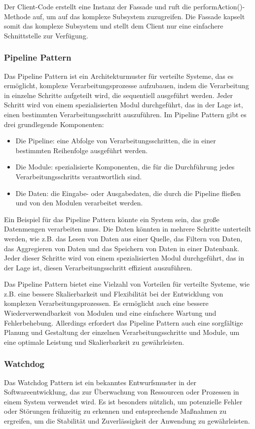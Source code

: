 \documentclass[../vs-script-first-v01.tex]{subfiles}
\begin{document}
Der Client-Code erstellt eine Instanz der Fassade und ruft die performAction()-Methode auf, um auf das komplexe Subsystem zuzugreifen. Die Fassade kapselt somit das komplexe Subsystem und stellt dem Client nur eine einfachere Schnittstelle zur Verfügung.




\subsubsection{Pipeline Pattern}
Das Pipeline Pattern ist ein Architekturmuster für verteilte Systeme, das es ermöglicht, komplexe Verarbeitungsprozesse aufzubauen, indem die Verarbeitung in einzelne Schritte aufgeteilt wird, die sequentiell ausgeführt werden. Jeder Schritt wird von einem spezialisierten Modul durchgeführt, das in der Lage ist, einen bestimmten Verarbeitungsschritt auszuführen. Im Pipeline Pattern gibt es drei grundlegende Komponenten:
\begin{itemize} 
\item Die Pipeline: eine Abfolge von Verarbeitungsschritten, die in einer bestimmten Reihenfolge ausgeführt werden.
\item Die Module: spezialisierte Komponenten, die für die Durchführung jedes Verarbeitungsschritts verantwortlich sind.
\item Die Daten: die Eingabe- oder Ausgabedaten, die durch die Pipeline fließen und von den Modulen verarbeitet werden.
\end{itemize} 
Ein Beispiel für das Pipeline Pattern könnte ein System sein, das große Datenmengen verarbeiten muss. Die Daten könnten in mehrere Schritte unterteilt werden, wie z.B. das Lesen von Daten aus einer Quelle, das Filtern von Daten, das Aggregieren von Daten und das Speichern von Daten in einer Datenbank. Jeder dieser Schritte wird von einem spezialisierten Modul durchgeführt, das in der Lage ist, diesen Verarbeitungsschritt effizient auszuführen.

Das Pipeline Pattern bietet eine Vielzahl von Vorteilen für verteilte Systeme, wie z.B. eine bessere Skalierbarkeit und Flexibilität bei der Entwicklung von komplexen Verarbeitungsprozessen. Es ermöglicht auch eine bessere Wiederverwendbarkeit von Modulen und eine einfachere Wartung und Fehlerbehebung. Allerdings erfordert das Pipeline Pattern auch eine sorgfältige Planung und Gestaltung der einzelnen Verarbeitungsschritte und Module, um eine optimale Leistung und Skalierbarkeit zu gewährleisten.

\subsubsection{Watchdog}
Das Watchdog Pattern ist ein bekanntes Entwurfsmuster in der Softwareentwicklung, das zur Überwachung von Ressourcen oder Prozessen in einem System verwendet wird. Es ist besonders nützlich, um potenzielle Fehler oder Störungen frühzeitig zu erkennen und entsprechende Maßnahmen zu ergreifen, um die Stabilität und Zuverlässigkeit der Anwendung zu gewährleisten.
\end{document}
